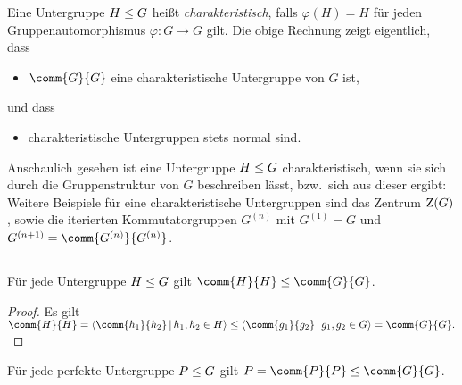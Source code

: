 \begin{remark}
  \label{remark: notion of characteristic subgroups}
  Eine Untergruppe $H \leq G$ heißt \emph{charakteristisch}, falls $\varphi(H) = H$ für jeden Gruppenautomorphismus $\varphi \colon G \to G$ gilt.
  Die obige Rechnung zeigt eigentlich, dass
  \begin{itemize}
    \item
      $\comm{G}{G}$ eine charakteristische Untergruppe von $G$ ist,
  \end{itemize}
  und dass
  \begin{itemize}
    \item
      charakteristische Untergruppen stets normal sind.
  \end{itemize}
  Anschaulich gesehen ist eine Untergruppe $H \leq G$ charakteristisch, wenn sie sich durch die Gruppenstruktur von $G$ beschreiben lässt, bzw.\ sich aus dieser ergibt:
  Weitere Beispiele für eine charakteristische Untergruppen sind das Zentrum $\operatorname{Z}(G)$, sowie die iterierten Kommutatorgruppen $G^{(n)}$ mit $G^{(1)} = G$ und $G^{(n+1)} = \comm{ G^{(n)} }{ G^{(n)} }$.
  
\end{remark}




\subsection{}
\label{subsection: perfect subgroup contained in commutator}

\begin{lemma}
  Für jede Untergruppe $H \leq G$ gilt $\comm{H}{H} \subgroup \comm{G}{G}$.
\end{lemma}

\begin{proof}
  Es gilt
  $
          \comm{H}{H}
    =     \generated{ \comm{h_1}{h_2} \suchthat h_1, h_2 \in H }
    \subgroup  \generated{ \comm{g_1}{g_2} \suchthat g_1, g_2 \in G }
    =     \comm{G}{G}.
  $
\end{proof}

Für jede perfekte Untergruppe $P \leq G$ gilt $P = \comm{P}{P} \subgroup \comm{G}{G}$.





\subsection{}

